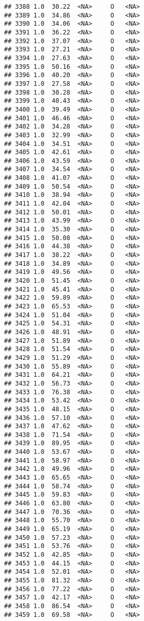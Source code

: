\documentclass[
]{article}
\begin{document}
\begin{verbatim}
## 3388 1.0  30.22  <NA>     O   <NA>
## 3389 1.0  34.86  <NA>     O   <NA>
## 3390 1.0  34.06  <NA>     O   <NA>
## 3391 1.0  36.22  <NA>     O   <NA>
## 3392 1.0  37.07  <NA>     O   <NA>
## 3393 1.0  27.21  <NA>     O   <NA>
## 3394 1.0  27.63  <NA>     O   <NA>
## 3395 1.0  50.16  <NA>     O   <NA>
## 3396 1.0  40.20  <NA>     O   <NA>
## 3397 1.0  27.58  <NA>     O   <NA>
## 3398 1.0  30.28  <NA>     O   <NA>
## 3399 1.0  40.43  <NA>     O   <NA>
## 3400 1.0  39.49  <NA>     O   <NA>
## 3401 1.0  46.46  <NA>     O   <NA>
## 3402 1.0  34.28  <NA>     O   <NA>
## 3403 1.0  32.99  <NA>     O   <NA>
## 3404 1.0  34.51  <NA>     O   <NA>
## 3405 1.0  42.61  <NA>     O   <NA>
## 3406 1.0  43.59  <NA>     O   <NA>
## 3407 1.0  34.54  <NA>     O   <NA>
## 3408 1.0  41.07  <NA>     O   <NA>
## 3409 1.0  50.54  <NA>     O   <NA>
## 3410 1.0  38.94  <NA>     O   <NA>
## 3411 1.0  42.04  <NA>     O   <NA>
## 3412 1.0  50.01  <NA>     O   <NA>
## 3413 1.0  43.99  <NA>     O   <NA>
## 3414 1.0  35.30  <NA>     O   <NA>
## 3415 1.0  50.08  <NA>     O   <NA>
## 3416 1.0  44.38  <NA>     O   <NA>
## 3417 1.0  38.22  <NA>     O   <NA>
## 3418 1.0  34.89  <NA>     O   <NA>
## 3419 1.0  49.56  <NA>     O   <NA>
## 3420 1.0  51.45  <NA>     O   <NA>
## 3421 1.0  45.41  <NA>     O   <NA>
## 3422 1.0  59.89  <NA>     O   <NA>
## 3423 1.0  65.53  <NA>     O   <NA>
## 3424 1.0  51.04  <NA>     O   <NA>
## 3425 1.0  54.31  <NA>     O   <NA>
## 3426 1.0  48.91  <NA>     O   <NA>
## 3427 1.0  51.89  <NA>     O   <NA>
## 3428 1.0  51.54  <NA>     O   <NA>
## 3429 1.0  51.29  <NA>     O   <NA>
## 3430 1.0  55.89  <NA>     O   <NA>
## 3431 1.0  64.21  <NA>     O   <NA>
## 3432 1.0  56.73  <NA>     O   <NA>
## 3433 1.0  76.38  <NA>     O   <NA>
## 3434 1.0  53.42  <NA>     O   <NA>
## 3435 1.0  48.15  <NA>     O   <NA>
## 3436 1.0  57.10  <NA>     O   <NA>
## 3437 1.0  47.62  <NA>     O   <NA>
## 3438 1.0  71.54  <NA>     O   <NA>
## 3439 1.0  89.95  <NA>     O   <NA>
## 3440 1.0  53.67  <NA>     O   <NA>
## 3441 1.0  58.97  <NA>     O   <NA>
## 3442 1.0  49.96  <NA>     O   <NA>
## 3443 1.0  65.65  <NA>     O   <NA>
## 3444 1.0  58.74  <NA>     O   <NA>
## 3445 1.0  59.83  <NA>     O   <NA>
## 3446 1.0  63.80  <NA>     O   <NA>
## 3447 1.0  70.36  <NA>     O   <NA>
## 3448 1.0  55.70  <NA>     O   <NA>
## 3449 1.0  65.19  <NA>     O   <NA>
## 3450 1.0  57.23  <NA>     O   <NA>
## 3451 1.0  53.76  <NA>     O   <NA>
## 3452 1.0  42.85  <NA>     O   <NA>
## 3453 1.0  44.15  <NA>     O   <NA>
## 3454 1.0  52.01  <NA>     O   <NA>
## 3455 1.0  81.32  <NA>     O   <NA>
## 3456 1.0  77.22  <NA>     O   <NA>
## 3457 1.0  42.17  <NA>     O   <NA>
## 3458 1.0  86.54  <NA>     O   <NA>
## 3459 1.0  69.58  <NA>     O   <NA>
\end{verbatim}
\end{document}
